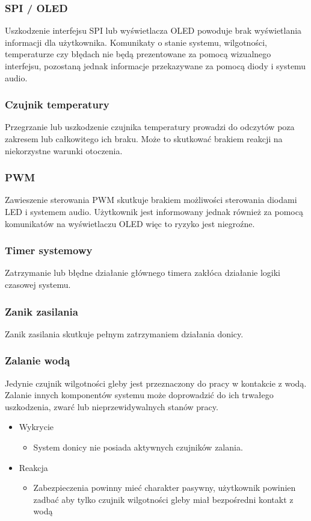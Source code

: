 \documentclass{article}
\begin{document}
\subsubsection{SPI / OLED}
Uszkodzenie interfejsu SPI lub wyświetlacza OLED powoduje brak wyświetlania informacji dla użytkownika. Komunikaty o stanie systemu, wilgotności, temperaturze czy błędach nie będą prezentowane za pomocą wizualnego interfejsu, pozostaną jednak informacje przekazywane za pomocą diody i systemu audio.

\subsubsection{Czujnik temperatury}
Przegrzanie lub uszkodzenie czujnika temperatury prowadzi do odczytów poza zakresem lub całkowitego ich braku. Może to skutkować brakiem reakcji na niekorzystne warunki otoczenia.

\subsubsection{PWM}
Zawieszenie sterowania PWM skutkuje brakiem możliwości sterowania diodami LED i systemem audio. Użytkownik jest informowany jednak również za pomocą komunikatów na wyświetlaczu OLED więc to ryzyko jest niegroźne.

\subsubsection{Timer systemowy}
Zatrzymanie lub błędne działanie głównego timera zakłóca działanie logiki czasowej systemu. 

\subsubsection{Zanik zasilania}
Zanik zasilania skutkuje pełnym zatrzymaniem działania donicy.

\subsubsection{Zalanie wodą}
Jedynie czujnik wilgotności gleby jest przeznaczony do pracy w kontakcie z wodą. Zalanie innych komponentów systemu może doprowadzić do ich trwałego uszkodzenia, zwarć lub nieprzewidywalnych stanów pracy.

\begin{itemize}
    \item Wykrycie
    \begin{itemize}
        \item System donicy nie posiada aktywnych czujników zalania.
    \end{itemize}
    \item Reakcja
    \begin{itemize}
        \item Zabezpieczenia powinny mieć charakter pasywny, użytkownik powinien zadbać aby tylko czujnik wilgotności gleby miał bezpośredni kontakt z wodą
    \end{itemize}
\end{itemize}
\end{document}
